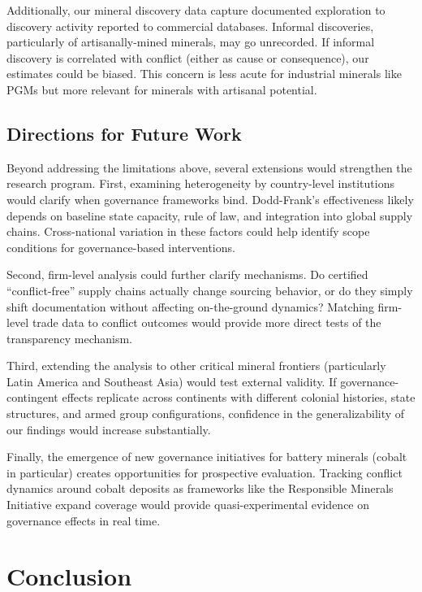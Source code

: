 \documentclass[11pt]{article}
\begin{document}
Additionally, our mineral discovery data capture documented exploration to discovery activity reported to commercial databases. Informal discoveries, particularly of artisanally-mined minerals, may go unrecorded. If informal discovery is correlated with conflict (either as cause or consequence), our estimates could be biased. This concern is less acute for industrial minerals like PGMs but more relevant for minerals with artisanal potential.

\subsection{Directions for Future Work}

Beyond addressing the limitations above, several extensions would strengthen the research program. First, examining heterogeneity by country-level institutions would clarify when governance frameworks bind. Dodd-Frank's effectiveness likely depends on baseline state capacity, rule of law, and integration into global supply chains. Cross-national variation in these factors could help identify scope conditions for governance-based interventions.

Second, firm-level analysis could further clarify mechanisms. Do certified ``conflict-free'' supply chains actually change sourcing behavior, or do they simply shift documentation without affecting on-the-ground dynamics? Matching firm-level trade data to conflict outcomes would provide more direct tests of the transparency mechanism.

Third, extending the analysis to other critical mineral frontiers (particularly Latin America and Southeast Asia) would test external validity. If governance-contingent effects replicate across continents with different colonial histories, state structures, and armed group configurations, confidence in the generalizability of our findings would increase substantially.

Finally, the emergence of new governance initiatives for battery minerals (cobalt in particular) creates opportunities for prospective evaluation. Tracking conflict dynamics around cobalt deposits as frameworks like the Responsible Minerals Initiative expand coverage would provide quasi-experimental evidence on governance effects in real time.

\section{Conclusion}
\end{document}
